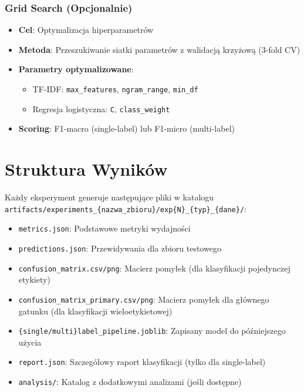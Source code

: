 \documentclass[12pt,a4paper]{article}
\begin{document}
\subsubsection{Grid Search (Opcjonalnie)}
\begin{itemize}
    \item \textbf{Cel}: Optymalizacja hiperparametrów
    \item \textbf{Metoda}: Przeszukiwanie siatki parametrów z walidacją krzyżową (3-fold CV)
    \item \textbf{Parametry optymalizowane}:
    \begin{itemize}
        \item TF-IDF: \texttt{max\_features}, \texttt{ngram\_range}, \texttt{min\_df}
        \item Regresja logistyczna: \texttt{C}, \texttt{class\_weight}
    \end{itemize}
    \item \textbf{Scoring}: F1-macro (single-label) lub F1-micro (multi-label)
\end{itemize}

\section{Struktura Wyników}

Każdy eksperyment generuje następujące pliki w katalogu \texttt{artifacts/experiments\_\{nazwa\_zbioru\}/exp\{N\}\_\{typ\}\_\{dane\}/}:

\begin{itemize}
    \item \texttt{metrics.json}: Podstawowe metryki wydajności
    \item \texttt{predictions.json}: Przewidywania dla zbioru testowego
    \item \texttt{confusion\_matrix.csv/png}: Macierz pomyłek (dla klasyfikacji pojedynczej etykiety)
    \item \texttt{confusion\_matrix\_primary.csv/png}: Macierz pomyłek dla głównego gatunku (dla klasyfikacji wieloetykietowej)
    \item \texttt{\{single/multi\}label\_pipeline.joblib}: Zapisany model do późniejszego użycia
    \item \texttt{report.json}: Szczegółowy raport klasyfikacji (tylko dla single-label)
    \item \texttt{analysis/}: Katalog z dodatkowymi analizami (jeśli dostępne)
\end{itemize}
\end{document}
